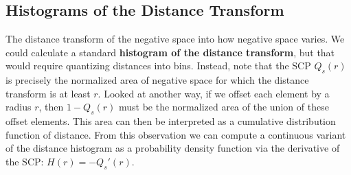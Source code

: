 \subsection{Histograms of the Distance Transform}
The distance transform of the negative space  into
how negative space varies.  We could calculate a standard \textbf{histogram of the
distance transform}, but that would require quantizing distances into bins.
Instead, note that the SCP $Q_s(r)$ is precisely the normalized area of 
negative space for which the distance transform is at least $r$. 
 Looked at another way, if we offset each element by a
   radius $r$, then $1-Q_s(r)$ must be the normalized 
     area of the union of these offset elements.
This area can then be interpreted as 
a cumulative distribution function of distance.  From this observation
we can compute a continuous variant of the distance histogram as a 
probability density function via the derivative of the SCP: $H(r)=-Q_s'(r)$.


